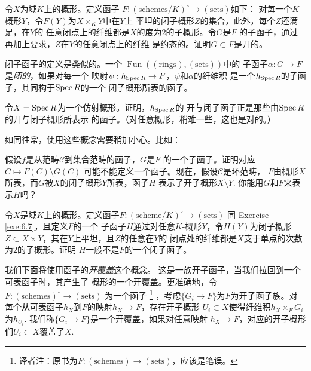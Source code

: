 \begin{exe} \label{exe:6.7}
令$X$为域$K$上的概形。定义函子
$F:(\text{schemes}/K)^\circ \to (\text{sets})$如下：
对每一个$K$-概形$Y$，令$F(Y)$为$X\times_K Y$中在$Y$上
平坦的闭子概形$Z$的集合，此外，每个$Z$还满足，在$Y$的
任意闭点上的纤维都是$X$的度为$2$的子概形。令$G$是$F$
的子函子，通过再加上要求，$Z$在$Y$的任意闭点上的纤维
是约态的。证明$G\subset F$是开的。
\end{exe}


闭子函子的定义是类似的。一个
$\operatorname{Fun}((\text{rings}),(\text{sets}))$中的
子函子$\alpha : G\to F$是\textit{闭的}，如果对每一个
映射$\psi:h_{\operatorname{Spec} R}\to F$，$\psi$和$\alpha$的纤维积
是一个$h_{\operatorname{Spec} R}$的子函子，其同构于$\operatorname{Spec} R$的一个
闭子概形所表的函子。

\begin{exe} \label{exe:6.8}
	令$X=\operatorname{Spec} R$为一个仿射概形。证明，$h_{\operatorname{Spec} R}$的
	开与闭子函子正是那些由$\operatorname{Spec} R$的开与闭子概形所表示
	的函子。（对任意概形，稍难一些，这也是对的。）
\end{exe}

如同往常，使用这些概念需要稍加小心。比如：

\begin{exe} \label{exe:6.9}
	假设$f$是从范畴$\mathscr C$到集合范畴的函子，$G$是$F$
	的一个子函子。证明对应$C\mapsto F(C)\setminus G(C)$
	可能不能定义一个函子。现在，假设$\mathscr C$是环范畴，
	$F$由概形$X$所表，而$G$被$X$的闭子概形$Y$所表，函子$H$
	表示了开子概形$X\setminus Y$. 你能用$G$和$F$来表示$H$吗？
\end{exe}

\begin{exe} \label{exe:6.10}
	令$X$是域$K$上的概形。定义函子$F:(\text{scheme}/K)^\circ
	\to (\text{sets})$
	同 Exercise \ref{exe:6.7}，且定义$F$的一个
	子函子$H$通过对任意$K$-概形$Y$，令$H(Y)$为闭子概形$Z
	\subset X\times Y$，其在$Y$上平坦，且$Z$的任意在$Y$的
	闭点处的纤维都是$X$支于单点的次数为$2$的子概形。证明
	$H$一般不是$F$的一个闭子函子。
\end{exe}

我们下面将使用函子的\textit{开覆盖}这个概念。
这是一族开子函子，当我们拉回到一个可表函子时，其产生了
概形的一个开覆盖。更准确地，令$F:(\text{schemes})^\circ
\to (\text{sets})$
为一个函子%
\footnote{译者注：原书为$F:(\text{schemes})
\to (\text{sets})$，应该是笔误。}%
，考虑$\{G_i\to F\}$为$F$为开子函子族。对
每个从可表函子$h_X$到$F$的映射$h_X\to F$，存在开子概形
$U_i\subset X$使得纤维积$h_X\times_F G_i$为$h_{U_i}$.
我们称$\{G_i\to F\}$是一个开覆盖，如果对任意映射
$h_X\to F$，对应的开子概形们$U_i\subset X$覆盖了$X$.


